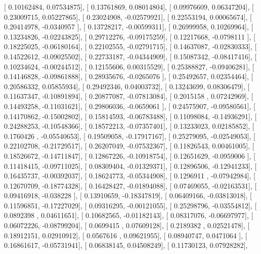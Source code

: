 \documentclass{article}
\begin{document}
       [ 0.10162484,  0.07534875],
       [ 0.13761869,  0.08014804],
       [ 0.09976609,  0.06347204],
       [ 0.23009715,  0.05227865],
       [ 0.23024908, -0.02579921],
       [ 0.22553194,  0.00065674],
       [ 0.20414978, -0.0340957 ],
       [ 0.13728217, -0.00599311],
       [ 0.26999958,  0.10269964],
       [ 0.13234826, -0.02243825],
       [ 0.29712276, -0.09175259],
       [ 0.12217668, -0.0798111 ],
       [ 0.18225025, -0.06180164],
       [ 0.22102555, -0.02791715],
       [ 0.14637087, -0.02830333],
       [ 0.14522612, -0.09025502],
       [ 0.22733187, -0.04344909],
       [ 0.15087342, -0.08417416],
       [ 0.10234624, -0.00244512],
       [ 0.12155606,  0.00315529],
       [ 0.25388827, -0.09406281],
       [ 0.14146828, -0.09861888],
       [ 0.28935676, -0.0265076 ],
       [ 0.25492657,  0.02354464],
       [ 0.20586332,  0.05855934],
       [ 0.29492346,  0.04003732],
       [ 0.13243699,  0.08306479],
       [ 0.11637347, -0.10891894],
       [ 0.20877087, -0.07813084],
       [ 0.2015158 ,  0.07242969],
       [ 0.14493258, -0.11031621],
       [ 0.29806036, -0.0659061 ],
       [ 0.24575907, -0.09580561],
       [ 0.14170862, -0.15002802],
       [ 0.15814593, -0.06783488],
       [ 0.11098084, -0.14936291],
       [ 0.24288253, -0.10548366],
       [ 0.18572213, -0.07357401],
       [ 0.13233023,  0.02185852],
       [ 0.1760426 , -0.05540653],
       [ 0.19509058, -0.17917167],
       [ 0.25279095, -0.02549053],
       [ 0.22102708, -0.21729517],
       [ 0.26207049, -0.07532367],
       [ 0.11826543,  0.00461005],
       [ 0.18526672, -0.14711847],
       [ 0.12867226, -0.10918754],
       [ 0.12651629, -0.0959006 ],
       [ 0.11418415, -0.09711025],
       [ 0.08309404, -0.01329371],
       [ 0.12896506, -0.12941233],
       [ 0.16435737, -0.00392037],
       [ 0.18624773, -0.05344908],
       [ 0.1296911 , -0.07942984],
       [ 0.12670709, -0.18774328],
       [ 0.16428427, -0.01894088],
       [ 0.07469055, -0.02163531],
       [ 0.09416918, -0.038228  ],
       [ 0.13910659, -0.18347819],
       [ 0.06409166, -0.03813018],
       [ 0.11596851, -0.17227029],
       [ 0.09316295, -0.00121055],
       [ 0.25298796, -0.03554812],
       [ 0.0892398 ,  0.04611651],
       [ 0.10682565, -0.01182143],
       [ 0.08317076, -0.06697977],
       [ 0.06072226, -0.08799204],
       [ 0.0699415 ,  0.07609128],
       [ 0.2189382 ,  0.02521478],
       [ 0.18912151,  0.02910912],
       [ 0.0567616 ,  0.09621955],
       [ 0.08940747,  0.0471064 ],
       [ 0.16861617, -0.05731941],
       [ 0.06838145,  0.04508249],
       [ 0.11730123,  0.07928282],
\end{document}

